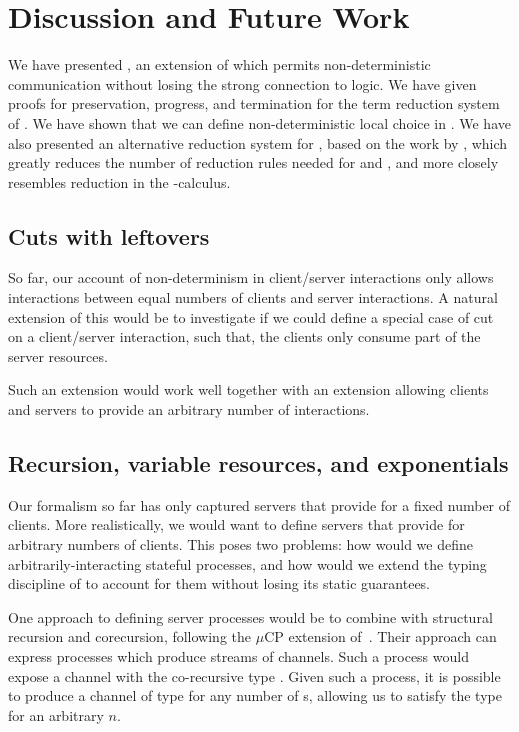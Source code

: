 \documentclass[UKenglish]{llncs}
\begin{document}
\section{Discussion and Future Work}\label{sec:discussion}
We have presented \nodcap, an extension of \cp which permits non-deterministic
communication without losing the strong connection to logic.
We have given proofs for preservation, progress, and termination for the term
reduction system of \nodcap.
We have shown that we can define non-deterministic local choice in \nodcap.
We have also presented an alternative reduction system for \cp, based on the
work by \textcite{lindley2015semantics}, which greatly reduces the number of
reduction rules needed for \cp and \nodcap, and more closely resembles reduction
in the \textpi-calculus.

\subsection{Cuts with leftovers}
So far, our account of non-determinism in client/server interactions only allows
interactions between equal numbers of clients and server interactions. A natural
extension of this would be to investigate if we could define a special case of
cut on a client/server interaction, such that, \eg the clients only consume
part of the server resources.
\begin{prooftree}
\end{prooftree}
Such an extension would work well together with an extension allowing clients
and servers to provide an arbitrary number of interactions.

\subsection{Recursion, variable resources, and exponentials}
Our formalism so far has only captured servers that provide for a fixed number of clients.  More realistically, we would want to define servers that provide for arbitrary numbers of clients.  This poses two problems: how would we define arbitrarily-interacting stateful processes, and how would we extend the typing discipline of \nodcap to account for them without losing its static guarantees.

One approach to defining server processes would be to combine \nodcap with structural recursion and corecursion, following the $\mu\text{CP}$ extension of~\textcite{lindley2016}.  Their approach can express processes which produce streams of  channels. Such a process would expose a channel with the co-recursive type .  Given such a process, it is possible to produce a channel of type  for any number of s, allowing us to satisfy the type  for an arbitrary $n$.
\end{document}
